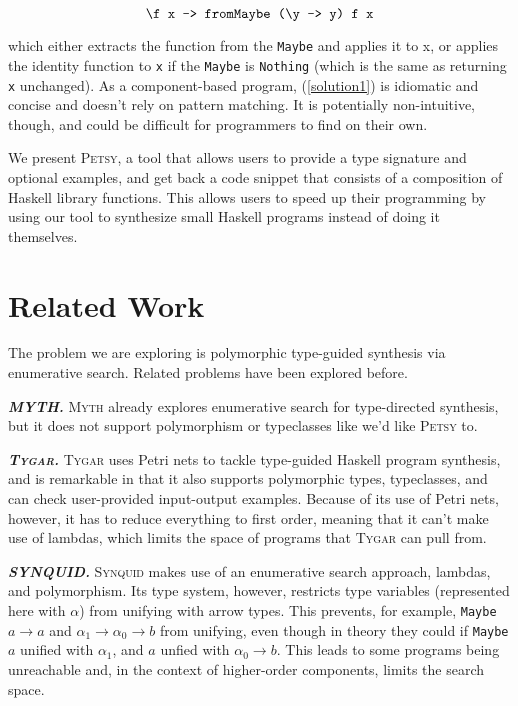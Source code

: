 \documentclass[acmsmall,nonacm]{acmart}
\begin{document}
\begin{equation}
  \label{solution1}
  \verb|\f x -> fromMaybe (\y -> y) f x|
\end{equation}

\noindent which either extracts the function from the \verb|Maybe| and applies it to x, 
or applies the identity function to \verb|x| if the \verb|Maybe| is \verb|Nothing|
(which is the same as returning \verb|x| unchanged). As a component-based program, 
(\ref{solution1}) is idiomatic and concise and doesn't rely on pattern matching. It is potentially 
non-intuitive, though, and could be difficult for programmers to find on their own. 

We present \textsc{Petsy}, a tool that allows users to provide a type signature and 
optional examples, and get back a code snippet 
that consists of a composition of Haskell library functions. This allows
users to speed up their programming by using our tool to synthesize small 
Haskell programs instead of doing it themselves. 




\section{Related Work}

The problem we are exploring is polymorphic type-guided synthesis via 
enumerative search. Related problems have been explored before. 

\vspace{2mm}
\noindent \textbf{\textit{MYTH.}} \textsc{Myth} \cite{myth}
already explores enumerative search for 
type-directed synthesis, but it does not support polymorphism or typeclasses 
like we'd like \textsc{Petsy} to. 

\vspace{2mm}
\noindent \textbf{\textit{\textsc{Tygar}.}} \textsc{Tygar} \cite{tygar} uses Petri nets to 
tackle type-guided Haskell program synthesis, and is remarkable in that 
it also supports polymorphic types, typeclasses, and can check 
user-provided input-output examples. Because of its use of Petri nets, 
however, it has to reduce everything to first order, meaning that 
it can't make use of lambdas, which limits the space of programs that
\textsc{Tygar} can pull from.

\vspace{2mm}
\noindent \textbf{\textit{SYNQUID.}} \textsc{Synquid} \cite{synquid} makes 
use of an enumerative search approach, lambdas, and polymorphism. 
Its type system, however, restricts type variables (represented here with $\alpha$)
from unifying with arrow types. This prevents, for example, 
\texttt{Maybe} ${a \to a}$ 
and ${\alpha_1 \to \alpha_0 \to b}$ from unifying, even though in theory
they could if \texttt{Maybe} $a$ unified with $\alpha_1$, and $a$ unfied 
with $\alpha_0 \to b$. This leads to some programs being unreachable
and, in the context of higher-order components, limits the search space. 
\end{document}
